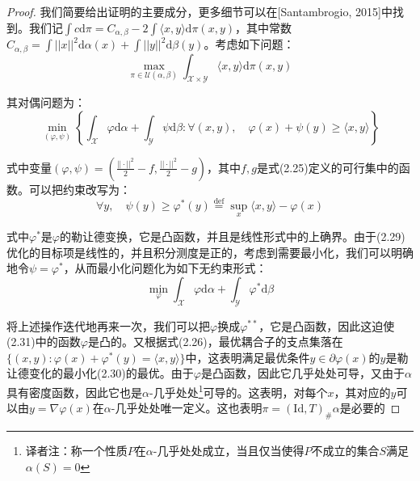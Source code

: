 \documentclass[cn,10pt,math=newtx,citestyle=gb7714-2015,bibstyle=gb7714-2015]{elegantbook}
\begin{document}
\begin{proof}
我们简要给出证明的主要成分，更多细节可以在[Santambrogio, 2015]中找到。我们记$\int c\text{d} \pi =C_{\alpha,\beta}-2\int\langle x,y\rangle \text{d}\pi(x,y)$，其中常数$C_{\alpha,\beta}=\int ||x||^2\text{d}\alpha(x)+\int ||y||^2\text{d}\beta(y)$。考虑如下问题：
\begin{equation*}
    \max\limits_{\pi\in\mathcal{U}(\alpha,\beta)} \int_{\mathcal{X}\times \mathcal{Y}} \langle x,y \rangle \text{d} \pi(x,y)
\end{equation*}

其对偶问题为：
\begin{equation}
    \label{2.29}
    \min\limits_{(\varphi,\psi)}\left\{ \int_\mathcal{X}\varphi \text{d}\alpha + \int_\mathcal{Y}\psi\text{d}\beta : \forall (x,y), \quad \varphi(x)+\psi(y)\geq \langle x,y \rangle \right\}
\end{equation}

式中变量$(\varphi,\psi)=\left(\frac{||\cdot||^2}{2}-f, \frac{||\cdot||^2}{2}-g\right)$，其中$f,g$是式(2.25)定义的可行集中的函数。可以把约束改写为：
\begin{equation}
    \label{2.30}
    \forall y,\quad \psi(y)\geq \varphi^*(y) \overset{\text{def}}{=} \sup\limits_x \langle x,y \rangle - \varphi(x)
\end{equation}

式中$\varphi^*$是$\varphi$的勒让德变换，它是凸函数，并且是线性形式中的上确界。由于(2.29)优化的目标项是线性的，并且积分测度是正的，考虑到需要最小化，我们可以明确地令$\psi=\varphi^*$，从而最小化问题化为如下无约束形式：
\begin{equation}
    \label{2.31}
    \min\limits_\varphi \int_\mathcal{X}\varphi \text{d}\alpha + \int_\mathcal{Y}\varphi^*\text{d}\beta
\end{equation}

将上述操作迭代地再来一次，我们可以把$\varphi$换成$\varphi^{**}$，它是凸函数，因此这迫使(2.31)中的函数$\varphi$是凸的。又根据式(2.26)，最优耦合子的支点集落在$\{ (x,y):\varphi(x)+\varphi^*(y)=\langle x,y \rangle \}$中，这表明满足最优条件$y\in\partial \varphi(x)$的$y$是勒让德变化的最小化(2.30)的最优。由于$\varphi$是凸函数，因此它几乎处处可导，又由于$\alpha$具有密度函数，因此它也是$\alpha$-几乎处处\footnote{译者注：称一个性质$P$在$\alpha$-几乎处处成立，当且仅当使得$P$不成立的集合$S$满足$\alpha(S)=0$}可导的。这表明，对每个$x$，其对应的$y$可以由$y=\nabla \varphi(x)$在$\alpha$-几乎处处唯一定义。这也表明$\pi=(\text{Id},T)_\# \alpha$是必要的

\end{proof}
\end{document}
